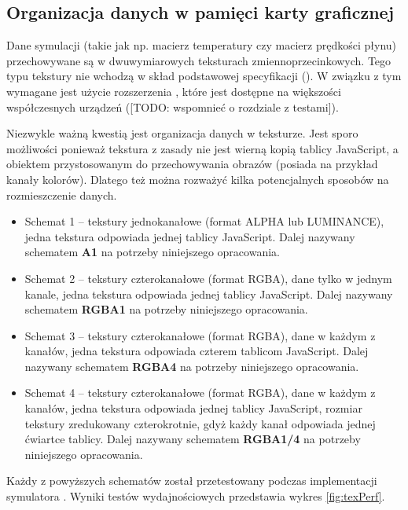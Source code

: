 \subsection{Organizacja danych w pamięci karty graficznej}
\label{sec:orgDanychWGPU}
Dane symulacji (takie jak np. macierz temperatury czy macierz prędkości płynu)
przechowywane są w dwuwymiarowych teksturach zmiennoprzecinkowych. Tego typu
tekstury nie wchodzą w skład podstawowej specyfikacji 
(\cite{WebGLSpec}). W związku z tym wymagane jest użycie rozszerzenia
, które jest dostępne na większości
współczesnych urządzeń ([TODO: wspomnieć o rozdziale z testami]).

Niezwykle ważną kwestią jest organizacja danych w teksturze. Jest sporo
możliwości ponieważ tekstura z zasady nie jest wierną kopią tablicy JavaScript,
a obiektem przystosowanym do przechowywania obrazów (posiada na przykład kanały
kolorów). Dlatego też można rozważyć kilka potencjalnych sposobów na
rozmieszczenie danych.

\begin{itemize}

\item Schemat 1 -- tekstury jednokanałowe (format ALPHA lub LUMINANCE), jedna
tekstura odpowiada jednej tablicy JavaScript. Dalej nazywany schematem
\textbf{A1} na potrzeby niniejszego opracowania.

\item Schemat 2 -- tekstury czterokanałowe (format RGBA), dane tylko w jednym
kanale, jedna tekstura odpowiada jednej tablicy JavaScript. Dalej nazywany
schematem \textbf{RGBA1} na potrzeby niniejszego opracowania.

\item Schemat 3 -- tekstury czterokanałowe (format RGBA), dane w każdym z
kanałów, jedna tekstura odpowiada czterem tablicom JavaScript. Dalej nazywany
schematem \textbf{RGBA4} na potrzeby niniejszego opracowania.

\item Schemat 4 -- tekstury czterokanałowe (format RGBA), dane w każdym z
kanałów, jedna tekstura odpowiada jednej tablicy JavaScript, rozmiar tekstury
zredukowany czterokrotnie, gdyż każdy kanał odpowiada jednej ćwiartce tablicy.
Dalej nazywany schematem \textbf{RGBA1/4} na potrzeby niniejszego opracowania.

\end{itemize}

Każdy z powyższych schematów został przetestowany podczas implementacji
symulatora . Wyniki testów wydajnościowych przedstawia wykres
\ref{fig:texPerf}.

